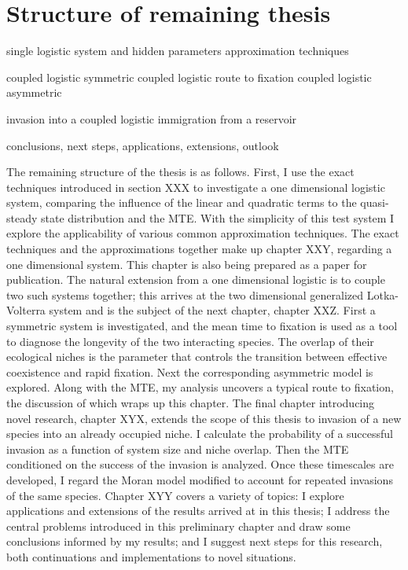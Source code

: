 \documentclass[a4paper,11pt]{article}
\numberwithin{equation}{section} %
\begin{document}
\section{Structure of remaining thesis}
single logistic system and hidden parameters
approximation techniques

coupled logistic symmetric
coupled logistic route to fixation
coupled logistic asymmetric

invasion into a coupled logistic
immigration from a reservoir

conclusions, next steps, applications, extensions, outlook


The remaining structure of the thesis is as follows. 
First, I use the exact techniques introduced in section XXX to investigate a one dimensional logistic system, comparing the influence of the linear and quadratic terms to the quasi-steady state distribution and the MTE. 
With the simplicity of this test system I explore the applicability of various common approximation techniques. 
The exact techniques and the approximations together make up chapter XXY, regarding a one dimensional system. 
This chapter is also being prepared as a paper for publication. 
The natural extension from a one dimensional logistic is to couple two such systems together; this arrives at the two dimensional generalized Lotka-Volterra system and is the subject of the next chapter, chapter XXZ. 
First a symmetric system is investigated, and the mean time to fixation is used as a tool to diagnose the longevity of the two interacting species. 
The overlap of their ecological niches is the parameter that controls the transition between effective coexistence and rapid fixation. 
Next the corresponding asymmetric model is explored. 
Along with the MTE, my analysis uncovers a typical route to fixation, the discussion of which wraps up this chapter. 
The final chapter introducing novel research, chapter XYX, extends the scope of this thesis to invasion of a new species into an already occupied niche. 
I calculate the probability of a successful invasion as a function of system size and niche overlap. 
Then the MTE conditioned on the success of the invasion is analyzed. 
Once these timescales are developed, I regard the Moran model modified to account for repeated invasions of the same species. 
Chapter XYY covers a variety of topics: I explore applications and extensions of the results arrived at in this thesis; I address the central problems introduced in this preliminary chapter and draw some conclusions informed by my results; and I suggest next steps for this research, both continuations and implementations to novel situations. 
\end{document}
